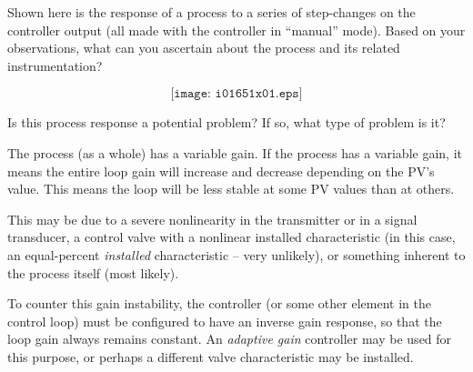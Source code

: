 

Shown here is the response of a process to a series of step-changes on the controller output (all made with the controller in ``manual'' mode).  Based on your observations, what can you ascertain about the process and its related instrumentation?

$$\texttt{[image: i01651x01.eps]}$$

Is this process response a potential problem?  If so, what type of problem is it?







The process (as a whole) has a variable gain.  If the process has a variable gain, it means the entire loop gain will increase and decrease depending on the PV's value.  This means the loop will be less stable at some PV values than at others.

This may be due to a severe nonlinearity in the transmitter or in a signal transducer, a control valve with a nonlinear installed characteristic (in this case, an equal-percent {\it installed} characteristic -- very unlikely), or something inherent to the process itself (most likely). 

To counter this gain instability, the controller (or some other element in the control loop) must be configured to have an inverse gain response, so that the loop gain always remains constant.  An {\it adaptive gain} controller may be used for this purpose, or perhaps a different valve characteristic may be installed.











